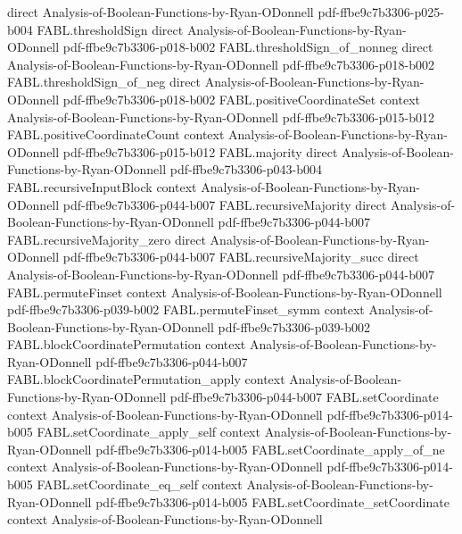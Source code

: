 \begin{theorem}
  {direct}
  {Analysis-of-Boolean-Functions-by-Ryan-ODonnell}
  {pdf-ffbe9c7b3306-p025-b004}
\proofstep
  {FABL.thresholdSign}
  {direct}
  {Analysis-of-Boolean-Functions-by-Ryan-ODonnell}
  {pdf-ffbe9c7b3306-p018-b002}
\proofstep
  {FABL.thresholdSign_of_nonneg}
  {direct}
  {Analysis-of-Boolean-Functions-by-Ryan-ODonnell}
  {pdf-ffbe9c7b3306-p018-b002}
\proofstep
  {FABL.thresholdSign_of_neg}
  {direct}
  {Analysis-of-Boolean-Functions-by-Ryan-ODonnell}
  {pdf-ffbe9c7b3306-p018-b002}
\proofstep
  {FABL.positiveCoordinateSet}
  {context}
  {Analysis-of-Boolean-Functions-by-Ryan-ODonnell}
  {pdf-ffbe9c7b3306-p015-b012}
\proofstep
  {FABL.positiveCoordinateCount}
  {context}
  {Analysis-of-Boolean-Functions-by-Ryan-ODonnell}
  {pdf-ffbe9c7b3306-p015-b012}
\proofstep
  {FABL.majority}
  {direct}
  {Analysis-of-Boolean-Functions-by-Ryan-ODonnell}
  {pdf-ffbe9c7b3306-p043-b004}
\proofstep
  {FABL.recursiveInputBlock}
  {context}
  {Analysis-of-Boolean-Functions-by-Ryan-ODonnell}
  {pdf-ffbe9c7b3306-p044-b007}
\proofstep
  {FABL.recursiveMajority}
  {direct}
  {Analysis-of-Boolean-Functions-by-Ryan-ODonnell}
  {pdf-ffbe9c7b3306-p044-b007}
\proofstep
  {FABL.recursiveMajority_zero}
  {direct}
  {Analysis-of-Boolean-Functions-by-Ryan-ODonnell}
  {pdf-ffbe9c7b3306-p044-b007}
\proofstep
  {FABL.recursiveMajority_succ}
  {direct}
  {Analysis-of-Boolean-Functions-by-Ryan-ODonnell}
  {pdf-ffbe9c7b3306-p044-b007}
\proofstep
  {FABL.permuteFinset}
  {context}
  {Analysis-of-Boolean-Functions-by-Ryan-ODonnell}
  {pdf-ffbe9c7b3306-p039-b002}
\proofstep
  {FABL.permuteFinset_symm}
  {context}
  {Analysis-of-Boolean-Functions-by-Ryan-ODonnell}
  {pdf-ffbe9c7b3306-p039-b002}
\proofstep
  {FABL.blockCoordinatePermutation}
  {context}
  {Analysis-of-Boolean-Functions-by-Ryan-ODonnell}
  {pdf-ffbe9c7b3306-p044-b007}
\proofstep
  {FABL.blockCoordinatePermutation_apply}
  {context}
  {Analysis-of-Boolean-Functions-by-Ryan-ODonnell}
  {pdf-ffbe9c7b3306-p044-b007}
\proofstep
  {FABL.setCoordinate}
  {context}
  {Analysis-of-Boolean-Functions-by-Ryan-ODonnell}
  {pdf-ffbe9c7b3306-p014-b005}
\proofstep
  {FABL.setCoordinate_apply_self}
  {context}
  {Analysis-of-Boolean-Functions-by-Ryan-ODonnell}
  {pdf-ffbe9c7b3306-p014-b005}
\proofstep
  {FABL.setCoordinate_apply_of_ne}
  {context}
  {Analysis-of-Boolean-Functions-by-Ryan-ODonnell}
  {pdf-ffbe9c7b3306-p014-b005}
\proofstep
  {FABL.setCoordinate_eq_self}
  {context}
  {Analysis-of-Boolean-Functions-by-Ryan-ODonnell}
  {pdf-ffbe9c7b3306-p014-b005}
\proofstep
  {FABL.setCoordinate_setCoordinate}
  {context}
  {Analysis-of-Boolean-Functions-by-Ryan-ODonnell}

\end{theorem}
